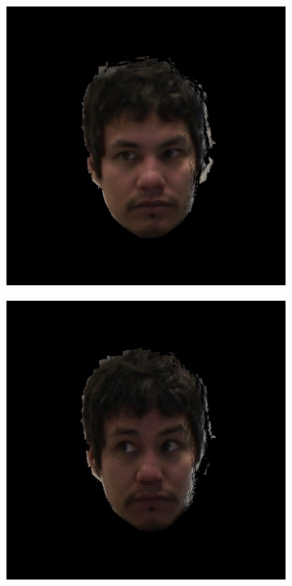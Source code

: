 \documentclass{ut-thesis}
\begin{document}
\begin{figure}[h]
	\centering
	\begin{subfigure}[b]{0.32\textwidth}
		\includegraphics[width=1.1\linewidth]{./img/eyeimages/s1.jpg}
	\end{subfigure}
	\begin{subfigure}[b]{0.32\textwidth}
		\includegraphics[width=1.1\linewidth]{./img/eyeimages/s2.jpg}

\end{subfigure}
\end{figure}
\end{document}
